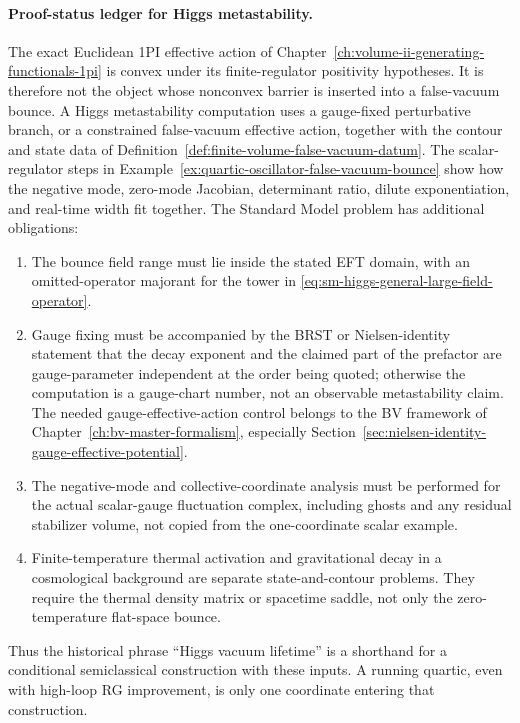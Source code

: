 \paragraph{Proof-status ledger for Higgs metastability.}
The exact Euclidean 1PI effective action of
Chapter~\ref{ch:volume-ii-generating-functionals-1pi} is convex under its
finite-regulator positivity hypotheses.  It is therefore not the object whose
nonconvex barrier is inserted into a false-vacuum bounce.  A Higgs
metastability computation uses a gauge-fixed perturbative branch, or a
constrained false-vacuum effective action, together with the contour and
state data of Definition~\ref{def:finite-volume-false-vacuum-datum}.  The
scalar-regulator steps in
Example~\ref{ex:quartic-oscillator-false-vacuum-bounce} show how the negative
mode, zero-mode Jacobian, determinant ratio, dilute exponentiation, and
real-time width fit together.  The Standard Model problem has additional
obligations:
\begin{enumerate}
\item The bounce field range must lie inside the stated EFT domain, with an
      omitted-operator majorant for the tower in
      \eqref{eq:sm-higgs-general-large-field-operator}.
\item Gauge fixing must be accompanied by the BRST or Nielsen-identity
      statement that the decay exponent and the claimed part of the prefactor
      are gauge-parameter independent at the order being quoted; otherwise the
      computation is a gauge-chart number, not an observable metastability
      claim.  The needed gauge-effective-action control belongs to the BV
      framework of Chapter~\ref{ch:bv-master-formalism}, especially
      Section~\ref{sec:nielsen-identity-gauge-effective-potential}.
\item The negative-mode and collective-coordinate analysis must be performed
      for the actual scalar-gauge fluctuation complex, including ghosts and
      any residual stabilizer volume, not copied from the one-coordinate
      scalar example.
\item Finite-temperature thermal activation and gravitational decay in a
      cosmological background are separate state-and-contour problems.  They
      require the thermal density matrix or spacetime saddle, not only the
      zero-temperature flat-space bounce.
\end{enumerate}
Thus the historical phrase ``Higgs vacuum lifetime'' is a shorthand for a
conditional semiclassical construction with these inputs.  A running quartic,
even with high-loop RG improvement, is only one coordinate entering that
construction.

